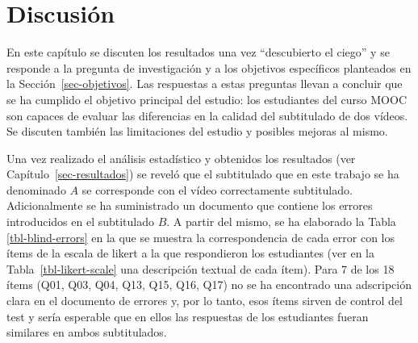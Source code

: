 \documentclass[
  12pt,
  a4paper,
  extrafontsizes,
  onecolumn,
  openright,
  table]{memoir}
\begin{document}

\hypertarget{sec-discusion}{%
\chapter{Discusión}\label{sec-discusion}}

\scriptsize

\normalsize

En este capítulo se discuten los resultados una vez \enquote{descubierto
el ciego} y se responde a la pregunta de investigación y a los objetivos
específicos planteados en la Sección~\ref{sec-objetivos}. Las respuestas
a estas preguntas llevan a concluir que se ha cumplido el objetivo
principal del estudio: los estudiantes del curso MOOC son capaces de
evaluar las diferencias en la calidad del subtitulado de dos vídeos. Se
discuten también las limitaciones del estudio y posibles mejoras al
mismo.

Una vez realizado el análisis estadístico y obtenidos los resultados
(ver Capítulo~\ref{sec-resultados}) se reveló que el subtitulado que en
este trabajo se ha denominado \(A\) se corresponde con el vídeo
correctamente subtitulado. Adicionalmente se ha suministrado un
documento que contiene los errores introducidos en el subtitulado \(B\).
A partir del mismo, se ha elaborado la Tabla \ref{tbl-blind-errors} en
la que se muestra la correspondencia de cada error con los ítems de la
\gls{escala de likert} a la que respondieron los estudiantes (ver en la
Tabla~\ref{tbl-likert-scale} una descripción textual de cada ítem). Para
7 de los 18 ítems (Q01, Q03, Q04, Q13, Q15, Q16, Q17) no se ha
encontrado una adscripción clara en el documento de errores y, por lo
tanto, esos ítems sirven de control del test y sería esperable que en
ellos las respuestas de los estudiantes fueran similares en ambos
subtitulados.
\end{document}
